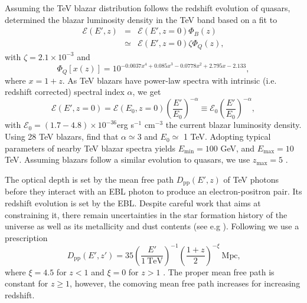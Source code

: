 \documentclass[numberedappendix]{emulateapj}
\begin{document}
Assuming the TeV blazar distribution follows the redshift evolution of quasars, \citet{2012ApJ...752...22B} determined the blazar luminosity density in the TeV band based on a fit to \citet{2007ApJ...654..731H}
\begin{eqnarray}
\label{eq:mean_heat}
\mathcal{E}(E',z)&=&\mathcal{E}(E',z=0)\Phi_{B}(z)\\ \nonumber
&\simeq& \mathcal{E}(E',z=0)\zeta\Phi_{Q}(z),
\end{eqnarray}
with $\zeta=2.1\times 10^{-3}$ and
\begin{equation}
\label{eq:phi_quasar}
\Phi_{Q}[x(z)]=10^{-0.0037x^4+0.085x^3-0.0778x^2+2.795x-2.133},
\end{equation}
where $x=1+z$.
As TeV blazars have power-law spectra with intrinsic (i.e. redshift corrected) spectral index $\alpha$, we get
\begin{equation}
\label{eq:blaz_lum}
\mathcal{E}(E',z=0)=\mathcal{E}(E_0,z=0)\left(\frac{E'}{E_0}\right)^{-\alpha}\equiv \mathcal{E}_0\left(\frac{E'}{E_0}\right)^{-\alpha},
\end{equation}
with $\mathcal{E}_0=(1.7-4.8)\times 10^{-36}$erg s$^{-1}$ cm$^{-3}$ the current blazar luminosity density. Using 28 TeV blazars, \citet{2012ApJ...752...23C} find that $\alpha\simeq 3$ and $E_0\simeq $ 1 TeV. Adopting typical parameters of nearby TeV blazar spectra yields $E_{\mathrm{min}}=100$ GeV, and $E_{\mathrm{max}}=10$ TeV. Assuming blazars follow a similar evolution to quasars, we use $z_\mathrm{max}=5$ \citep{2007ApJ...654..731H}.

The optical depth is set by the mean free path $D_\mathrm{pp}(E',z)$ of TeV photons before they interact with an EBL photon to produce an electron-positron pair. Its redshift evolution is set by the EBL. Despite careful work that aims at constraining it, there remain uncertainties in the star formation history of the universe as well as its metallicity and dust contents (see e.g \citet{2008A&A...487..837F,2006ApJ...648..774S}). Following \citet{2012ApJ...752...23C} we use a prescription
\begin{equation}
\label{eq:mean_free_path}
D_{\mathrm{pp}}(E',z')=35\left(\frac{E'}{1~\textrm{TeV}}\right)^{-1} \left(\frac{1+z}{2}\right)^{-\xi}~\textrm{Mpc,}
\end{equation}
where $\xi=4.5$ for $z<1$ and $\xi=0$ for $z>1$ \citep{2004A&A...413..807K,2009PhRvD..80l3012N}. The proper mean free path is constant for $z\geq 1$, however, the comoving mean free path increases for increasing redshift.
\end{document}
